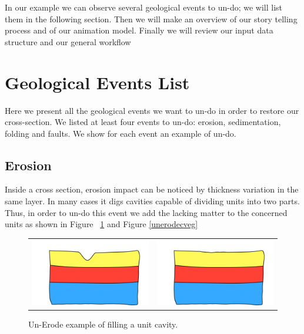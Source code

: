 \documentclass[12pt, a4paper]{report} %
\begin{document}
In our example we can observe several geological events to un-do; we will list them in the following section.
Then we will make an overview of our story telling process and of our animation model. Finally we will review our input data structure and our general workflow

\section{Geological Events List}
Here we present all the geological events we want to un-do in order to restore our cross-section.
We listed at least four events to un-do: erosion, sedimentation, folding and faults. We show for each event an example of un-do.
\subsection{Erosion}
Inside a cross section, erosion impact can be noticed by thickness variation in the same layer.
In many cases it digs cavities capable of dividing units into two parts. Thus, in order to un-do this event we add the lacking matter to the concerned units as shown in Figure ~\ref{unerodeeg} and Figure \ref{unerodecveg}

\begin{figure}[htb]
\centering
\begin{tabular}{@{}cc@{}}
\includegraphics[width=.35\textwidth]{unErodeUpDescription0.png}&
\includegraphics[width=.35\textwidth]{unErodeUpDescription1.png}\\
\end{tabular}
\caption{Un-Erode example of filling a unit cavity.}
\label{unerodeeg}
\end{figure}
\end{document}
